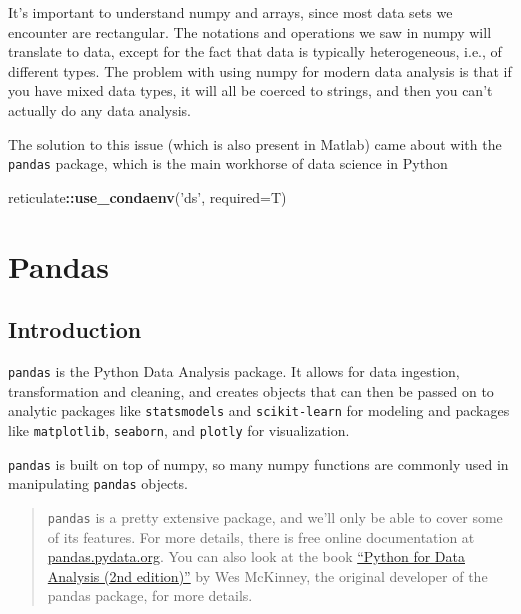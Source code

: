 \documentclass[
  letterpaper,
]{scrbook}
\newenvironment{Shaded}{\begin{snugshade}}{\end{snugshade}}
\newcommand{\DataTypeTok}[1]{\textcolor[rgb]{0.13,0.29,0.53}{#1}}
\newcommand{\KeywordTok}[1]{\textcolor[rgb]{0.13,0.29,0.53}{\textbf{#1}}}
\newcommand{\NormalTok}[1]{#1}
\newcommand{\OperatorTok}[1]{\textcolor[rgb]{0.81,0.36,0.00}{\textbf{#1}}}
\newcommand{\StringTok}[1]{\textcolor[rgb]{0.31,0.60,0.02}{#1}}
\begin{document}
It's important to understand numpy and arrays, since most data sets we encounter are rectangular. The notations and operations we saw in numpy will translate to data, except for the fact that data is typically heterogeneous, i.e., of different types. The problem with using numpy for modern data analysis is that if you have mixed data types, it will all be coerced to strings, and then you can't actually do any data analysis.

The solution to this issue (which is also present in Matlab) came about with the \texttt{pandas} package, which is the main workhorse of data science in Python

\begin{Shaded}
\begin{Highlighting}[]
\NormalTok{reticulate}\OperatorTok{::}\KeywordTok{use_condaenv}\NormalTok{(}\StringTok{'ds'}\NormalTok{, }\DataTypeTok{required=}\NormalTok{T)}
\end{Highlighting}
\end{Shaded}

\hypertarget{pandas}{%
\chapter{Pandas}\label{pandas}}

\hypertarget{introduction}{%
\section{Introduction}\label{introduction}}

\texttt{pandas} is the Python Data Analysis package. It allows for data ingestion, transformation and cleaning, and creates objects that can then be passed on to analytic packages like \texttt{statsmodels} and \texttt{scikit-learn} for modeling and packages like \texttt{matplotlib}, \texttt{seaborn}, and \texttt{plotly} for visualization.

\texttt{pandas} is built on top of numpy, so many numpy functions are commonly used in manipulating \texttt{pandas} objects.

\begin{quote}
\texttt{pandas} is a pretty extensive package, and we'll only be able to cover some of its features. For more details, there is free online documentation at \href{https://pandas.pydata.org}{pandas.pydata.org}. You can also look at the book \href{https://www.amazon.com/Python-Data-Analysis-Wrangling-IPython-dp-1491957662/dp/1491957662/}{``Python for Data Analysis (2nd edition)''} by Wes McKinney, the original developer of the pandas package, for more details.
\end{quote}
\end{document}
